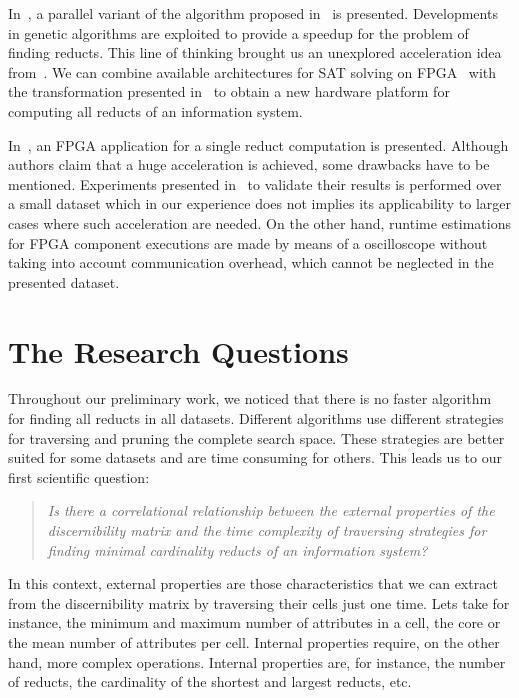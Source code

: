 \documentclass[11pt]{article}   %
\begin{document}
  In~\cite{Wroblewski98}, a parallel variant of the algorithm proposed in~\cite{Wroblewski95} is presented.
  Developments in genetic algorithms are exploited to provide a speedup for the problem of finding reducts.
  This line of thinking brought us an unexplored acceleration idea from~\cite{Jensen14}. We can combine 
  available architectures for SAT solving on FPGA~\cite{Safar07,Kanazawa11} with the transformation
  presented in~\cite{Jensen14} to obtain a new hardware platform for computing all reducts of an information 
  system.
  
  In~\cite{Grzes13,Kopczynski14}, an FPGA application for a single reduct computation is presented. Although
  authors claim that a huge acceleration is achieved, some drawbacks have to be mentioned. Experiments presented 
  in~\cite{Kopczynski14} to validate their results is performed over a small dataset which in our experience 
  does not implies its applicability to larger cases where such acceleration are needed. On the other hand, 
  runtime estimations for FPGA component executions are made by means of a oscilloscope without taking into 
  account communication overhead, which cannot be neglected in the presented dataset.

\section{The Research Questions}\label{ResearchQuestions} 
  Throughout our preliminary work, we noticed that there is no faster algorithm for finding all reducts in 
  all datasets. Different algorithms use different strategies for traversing and pruning the complete search 
  space. These strategies are better suited for some datasets and are time consuming for others. This leads 
  us to our first scientific question:
  
\begin{quote}
  \emph{Is there a correlational relationship between the external properties of the discernibility matrix and the time 
  		complexity of traversing strategies for finding minimal cardinality reducts of an information
  		system?}
\end{quote}
  		
  In this context, external properties are those characteristics that we can extract from the discernibility
  matrix by traversing their cells just one time. Lets take for instance, the minimum and maximum number of
  attributes in a cell, the core or the mean number of attributes per cell. Internal properties require, on 
  the other hand, more complex operations. Internal properties are, for instance, the number of reducts, the
  cardinality of the shortest and largest reducts, etc.
  
\end{document}
